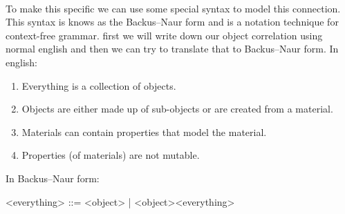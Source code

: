 \documentclass{scrartcl}
\begin{document}
    \paragraph{}
    To make this specific we can use some special syntax to model this connection.
    This syntax is knows as the Backus–Naur form and is a notation technique for context-free
    grammar. first we will write down our object correlation using normal english and then we
    can try to translate that to Backus–Naur form.
    \newline
    In english:
    \newline
    \begin{enumerate}
        \item Everything is a collection of objects.
        \item Objects are either made up of sub-objects or are created from a material.
        \item Materials can contain properties that model the material.
        \item Properties (of materials) are not mutable.
    \end{enumerate}

    In Backus–Naur form:

    \begin{description}
        \item <everything> ::= <object> | <object><everything>
    \end{description}
\end{document}
